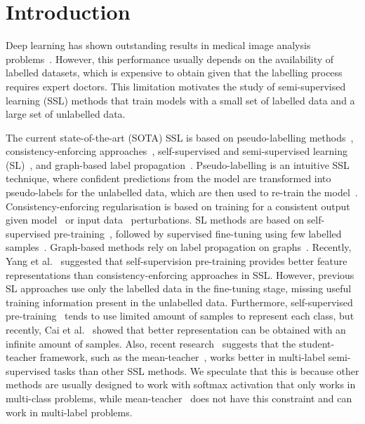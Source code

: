 \documentclass[runningheads]{llncs}
\begin{document}
\section{Introduction}
\vspace{-.1in}
\label{sec:introduction}

Deep learning has shown outstanding results in medical image analysis problems~\cite{lee2017deep,tian2020few,li2018thoracic,tian2019one,liu2020self,jonmohamadi2020automatic}. 
However, this performance usually depends on the availability of labelled datasets, which is expensive to obtain given that the labelling process requires expert doctors.
This limitation motivates the study of semi-supervised learning (SSL) methods that train models with a small set of labelled data and a large set of unlabelled data. 

The current state-of-the-art (SOTA) SSL is based on 
pseudo-labelling methods~\cite{rizve2021defense,lee2013pseudo}, consistency-enforcing approaches~\cite{berthelot2019remixmatch,tarvainen2017mean,laine2016temporal}, self-supervised and semi-supervised learning (SL)~\cite{chen2020big,zhai2019s4l}, and graph-based label propagation~\cite{aviles2019graphx}.  Pseudo-labelling is an intuitive SSL technique, where confident predictions from the model are transformed into pseudo-labels for the unlabelled data, which are then used to re-train the model~\cite{lee2013pseudo}.
Consistency-enforcing regularisation is based on training for a consistent output given model~\cite{liu2020semi,tarvainen2017mean} or input data~\cite{berthelot2019remixmatch,laine2016temporal} perturbations. 
SL methods are based on self-supervised pre-training~\cite{moco,simclr}, followed by supervised fine-tuning using few labelled samples~\cite{chen2020big,zhai2019s4l}.
Graph-based methods rely on label propagation on graphs~\cite{aviles2019graphx}.
Recently, Yang et al.~\cite{yang2020rethinking} suggested that self-supervision pre-training provides better feature representations than consistency-enforcing approaches in SSL.  
However, previous SL approaches use only the labelled data in the fine-tuning stage, missing useful training information present in the unlabelled data. 
Furthermore, self-supervised pre-training~\cite{simclr,moco} tends to use limited amount of samples to represent each class, but recently, Cai et al.~\cite{cai2020joint} showed that better representation can be obtained with an infinite amount of samples.
Also, recent research~\cite{rizve2021defense} suggests that the student-teacher framework, such as the mean-teacher~\cite{tarvainen2017mean}, works better in multi-label semi-supervised tasks
than other SSL methods.
We speculate that this is because other methods are usually designed to work with softmax activation that only works in multi-class problems, while mean-teacher~\cite{tarvainen2017mean} does not have this constraint and can work in multi-label problems.  
\end{document}
